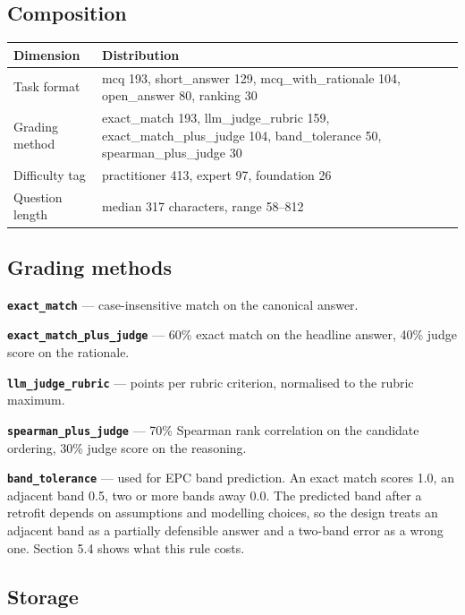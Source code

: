 \documentclass[11pt,a4paper]{article}
\begin{document}
\subsection{Composition}

\begin{center}
\small
\begin{tabularx}{\textwidth}{l>{\raggedright\arraybackslash}X}
\toprule
Dimension & Distribution \\
\midrule
Task format & mcq 193, short\_answer 129, mcq\_with\_rationale 104, open\_answer 80, ranking 30 \\
Grading method & exact\_match 193, llm\_judge\_rubric 159, exact\_match\_plus\_judge 104, band\_tolerance 50, spearman\_plus\_judge 30 \\
Difficulty tag & practitioner 413, expert 97, foundation 26 \\
Question length & median 317 characters, range 58--812 \\
\bottomrule
\end{tabularx}
\end{center}

\subsection{Grading methods}

\textbf{\texttt{exact\_match}} --- case-insensitive match on the canonical answer.

\textbf{\texttt{exact\_match\_plus\_judge}} --- 60\% exact match on the headline answer, 40\% judge score on the rationale.

\textbf{\texttt{llm\_judge\_rubric}} --- points per rubric criterion, normalised to the rubric maximum.

\textbf{\texttt{spearman\_plus\_judge}} --- 70\% Spearman rank correlation on the candidate ordering, 30\% judge score on the reasoning.

\textbf{\texttt{band\_tolerance}} --- used for EPC band prediction. An exact match scores 1.0, an adjacent band 0.5, two or more bands away 0.0. The predicted band after a retrofit depends on assumptions and modelling choices, so the design treats an adjacent band as a partially defensible answer and a two-band error as a wrong one. Section 5.4 shows what this rule costs.

\subsection{Storage}
\end{document}
